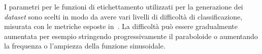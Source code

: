 I parametri per le funzioni di etichettamento utilizzati per la generazione dei \emph{dataset} sono scelti in modo da avere vari livelli di difficoltà di classificazione, misurata con le metriche esposte in~.
La difficoltà può essere gradualmente aumentata per esempio stringendo progressivamente il paraboloide o aumentando la frequenza o l'ampiezza della funzione sinusoidale.

